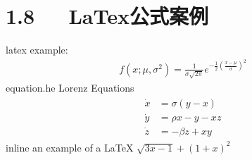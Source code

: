 \documentclass[letterpaper,12pt,english]{sphinxmanual}
\begin{document}
\section{1.8   LaTex公式案例}
\label{\detokenize{001software/001install/sublime:latex}}
latex example:
\begin{equation*}
\begin{split}f(x;\mu,\sigma^2) = \frac{1}{\sigma\sqrt{2\pi}} e^{ -\frac{1}{2}\left(\frac{x-\mu}{\sigma}\right)^2 }\end{split}
\end{equation*}
equation.he Lorenz Equations
\begin{equation*}
\begin{split}\begin{aligned}\dot{x} & = \sigma(y-x) \\\dot{y} & = \rho x - y - xz \\\dot{z} & = -\beta z + xy\end{aligned}\end{split}
\end{equation*}
inline an example of a LaTeX
\(\sqrt{3x-1}+(1+x)^2\)
\end{document}
